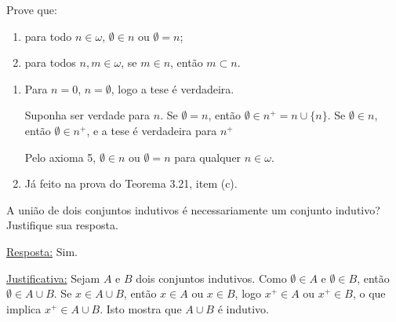 \begin{exercicio}
	Prove que:
	\begin{enumerate}[label=(\alph{*})]
		\item para todo $n\in\omega$, $\emptyset\in n$ ou $\emptyset=n$;
		\item para todos $n,m\in\omega$, se $m\in n$, então $m\subset n$.
	\end{enumerate}
\end{exercicio}
\begin{solucao}
	\begin{enumerate}[label=(\alph{*})]
		\item Para $n=0$, $n=\emptyset$, logo a tese é verdadeira.
		
		Suponha ser verdade para $n$. Se $\emptyset=n$, então $\emptyset\in n^+=n\cup\{n\}$. Se $\emptyset\in n$, então $\emptyset\in n^+$, e a tese é verdadeira para $n^+$
		
		Pelo axioma 5, $\emptyset\in n$ ou $\emptyset=n$ para qualquer $n\in\omega$.
		\item Já feito na prova do Teorema 3.21, item (c).
	\end{enumerate}
\end{solucao}

\begin{exercicio}
	A união de dois conjuntos indutivos é necessariamente um conjunto indutivo? Justifique sua resposta.
\end{exercicio}
\begin{solucao}
	
	\underline{Resposta:} Sim.
	
	\underline{Justificativa:} Sejam $A$ e $B$ dois conjuntos indutivos. Como $\emptyset\in A$ e $\emptyset\in B$, então $\emptyset\in A\cup B$. Se $x\in A\cup B$, então $x\in A$ ou $x\in B$, logo $x^+\in A$ ou $x^+\in B$, o que implica $x^+\in A\cup B$. Isto mostra que $A\cup B$ é indutivo.
\end{solucao}